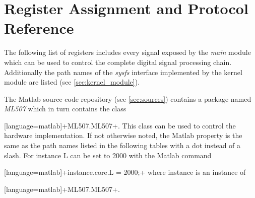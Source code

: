 \documentclass[12pt,a4paper,parskip=full,abstract=true,BCOR=12mm,twoside,open=right]{scrreprt}
\newcommand{\hack}{}
\newcommand*{\SavedLstInline}{}
\DeclareRobustCommand*{\lstinline}{%
  \ifmmode
    \let\SavedBGroup\bgroup
    \def\bgroup{%
      \let\bgroup\SavedBGroup
      \hbox\bgroup
    }%
  \fi
  \SavedLstInline
}
\def\device#1{\mbox{\textit{#1}}}
\begin{document}
\section{Register Assignment and Protocol Reference}
\label{sec:registers}
\providecommand{\flag}[1]{{\scriptsize\hack #1}}

The following list of registers includes every signal exposed by the \device{main} module which can be used
to control the complete digital signal processing chain. Additionally the path names of
the \device{sysfs} interface implemented by the kernel module are listed (see \cref{sec:kernel_module}).

The Matlab source code repository (see \cref{sec:sources}) contains a package
named \device{ML507} which in turn contains the class \lstinline[language=matlab]+ML507.ML507+. This
class can be used to control the hardware implementation. If not otherwise noted,
the Matlab property is the same as the path names listed in the following tables
with a dot instead of a slash. For instance \gls{L} can be set to 2000 with the
Matlab command \lstinline[language=matlab]+instance.core.L = 2000;+ where instance
is an instance of \lstinline[language=matlab]+ML507.ML507+.
\end{document}
